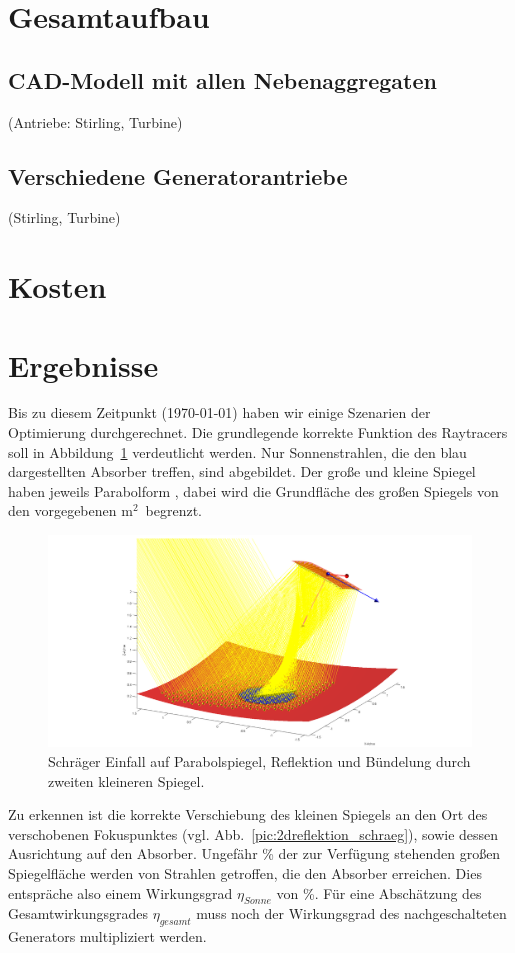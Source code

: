 \documentclass[fontsize=10pt,paper=a4,bibliography=totoc]{scrartcl}
\begin{document}
\section{Gesamtaufbau}
\subsection{CAD-Modell mit allen Nebenaggregaten}
 (Antriebe: Stirling, Turbine)
\subsection{Verschiedene Generatorantriebe}
 (Stirling, Turbine)
\section{Kosten}

\section{Ergebnisse}
Bis zu diesem Zeitpunkt (\today) haben wir einige Szenarien der Optimierung durchgerechnet. Die grundlegende korrekte Funktion des Raytracers soll in Abbildung~\ref{pic:netteReflektion} verdeutlicht werden. Nur Sonnenstrahlen, die den blau dargestellten Absorber treffen, sind abgebildet. Der große und kleine Spiegel haben jeweils Parabolform , dabei wird die Grundfläche des großen Spiegels von den vorgegebenen \unit[10]{m$^2$} begrenzt.
\begin{figure}[htb]
	\centering
	\includegraphics[width=\textwidth]{images/netteReflektion}
	\caption[Bündelung schräg]{Schräger Einfall auf Parabolspiegel, Reflektion und Bündelung durch zweiten kleineren Spiegel.}
	\label{pic:netteReflektion}
\end{figure}
Zu erkennen ist die korrekte Verschiebung des kleinen Spiegels an den Ort des verschobenen Fokuspunktes (vgl. Abb.~\ref{pic:2dreflektion_schraeg}), sowie dessen Ausrichtung auf den Absorber.
Ungefähr \unit[40]{\%} der zur Verfügung stehenden großen Spiegelfläche werden von Strahlen getroffen, die den Absorber erreichen. Dies entspräche also einem Wirkungsgrad $\eta_{Sonne}$ von \unit[40]{\%}. Für eine Abschätzung des Gesamtwirkungsgrades $\eta_{gesamt}$ muss noch der Wirkungsgrad des nachgeschalteten Generators multipliziert werden.
\end{document}
